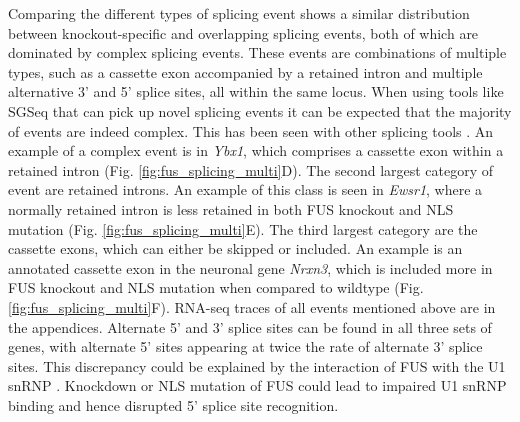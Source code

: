 Comparing the different types of splicing event shows a similar distribution between knockout-specific and overlapping splicing events, both of which are dominated by complex splicing events.
These events are combinations of multiple types, such as a cassette exon accompanied by a retained intron and multiple alternative 3' and 5' splice sites, all within the same locus. 
When using tools like SGSeq that can pick up novel splicing events it can be expected that the majority of events are indeed complex. This has been seen with other splicing tools \citep{Vaquero-Garcia2016}.
An example of a complex event is in \textit{Ybx1}, which comprises a cassette exon within a retained intron  (Fig. \ref{fig:fus_splicing_multi}D).
The second largest category of event are retained introns.
An example of this class is seen in \textit{Ewsr1}, where a normally retained intron is less retained in both FUS knockout and NLS mutation (Fig. \ref{fig:fus_splicing_multi}E).
The third largest category are the cassette exons, which can either be skipped or included. 
An example is an annotated cassette exon in the neuronal gene \textit{Nrxn3}, which is included more in FUS knockout and NLS mutation when compared to wildtype (Fig. \ref{fig:fus_splicing_multi}F).
RNA-seq traces of all events mentioned above are in the appendices.
Alternate 5' and 3' splice sites can be found in all three sets of genes, with alternate 5' sites appearing at twice the rate of alternate 3' splice sites. 
This discrepancy could be explained by the interaction of FUS with the U1 snRNP \citep{Yu2015a,Yu2015b}.
Knockdown or NLS mutation of FUS could lead to impaired U1 snRNP binding and hence disrupted 5' splice site recognition.



